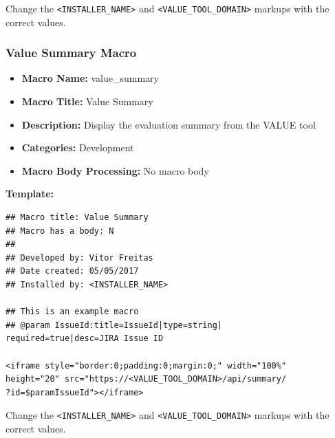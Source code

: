 \documentclass{article}
\begin{document}
Change the \texttt{\textless INSTALLER\_NAME\textgreater} and \texttt{\textless VALUE\_TOOL\_DOMAIN\textgreater} markups with the correct values.

\subsubsection{Value Summary Macro}

\begin{itemize}
    \item \textbf{Macro Name:} value\_summary
    \item \textbf{Macro Title:} Value Summary
    \item \textbf{Description:} Display the evaluation summary from the VALUE tool
    \item \textbf{Categories:} Development
    \item \textbf{Macro Body Processing:} No macro body
\end{itemize}

\textbf{Template:}

\begin{lstlisting}[frame=single]
## Macro title: Value Summary
## Macro has a body: N
##
## Developed by: Vitor Freitas
## Date created: 05/05/2017
## Installed by: <INSTALLER_NAME>

## This is an example macro
## @param IssueId:title=IssueId|type=string|
required=true|desc=JIRA Issue ID

<iframe style="border:0;padding:0;margin:0;" width="100%"
height="20" src="https://<VALUE_TOOL_DOMAIN>/api/summary/
?id=$paramIssueId"></iframe>

\end{lstlisting}

Change the \texttt{\textless INSTALLER\_NAME\textgreater} and \texttt{\textless VALUE\_TOOL\_DOMAIN\textgreater} markups with the correct values.
\end{document}
